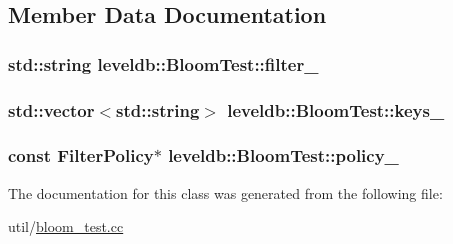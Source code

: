 \subsection{Member Data Documentation}
\hypertarget{classleveldb_1_1_bloom_test_a13fbea63f8f60fd3987745a5110084f1}{
\subsubsection[{filter\-\_\-}]{\setlength{\rightskip}{0pt plus 5cm}std\-::string leveldb\-::\-Bloom\-Test\-::filter\-\_\-\hspace{0.3cm}{\ttfamily [private]}}}\label{classleveldb_1_1_bloom_test_a13fbea63f8f60fd3987745a5110084f1}
\hypertarget{classleveldb_1_1_bloom_test_ad368ca79808b8350f679bb5f049d8095}{
\subsubsection[{keys\-\_\-}]{\setlength{\rightskip}{0pt plus 5cm}std\-::vector$<$std\-::string$>$ leveldb\-::\-Bloom\-Test\-::keys\-\_\-\hspace{0.3cm}{\ttfamily [private]}}}\label{classleveldb_1_1_bloom_test_ad368ca79808b8350f679bb5f049d8095}
\hypertarget{classleveldb_1_1_bloom_test_aad08549895e8878b853205916a074cde}{
\subsubsection[{policy\-\_\-}]{\setlength{\rightskip}{0pt plus 5cm}const {\bf Filter\-Policy}$\ast$ leveldb\-::\-Bloom\-Test\-::policy\-\_\-\hspace{0.3cm}{\ttfamily [private]}}}\label{classleveldb_1_1_bloom_test_aad08549895e8878b853205916a074cde}


The documentation for this class was generated from the following file\-:\begin{DoxyCompactItemize}
\item 
util/\hyperlink{bloom__test_8cc}{bloom\-\_\-test.\-cc}\end{DoxyCompactItemize}
